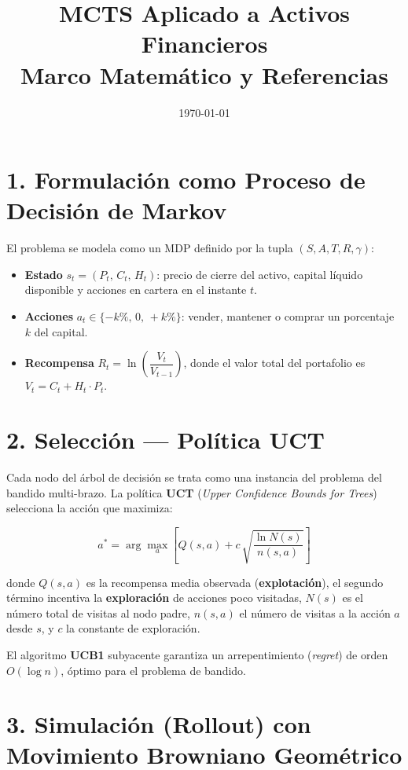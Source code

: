 \documentclass[11pt, a4paper]{article}
\title{\textbf{MCTS Aplicado a Activos Financieros}\\[0.4em]
\large Marco Matemático y Referencias}
\author{}
\date{\today}
\begin{document}
\maketitle
\thispagestyle{empty}

\section*{1. Formulación como Proceso de Decisión de Markov}

El problema se modela como un MDP definido por la tupla $(S, A, T, R, \gamma)$:

\begin{itemize}
  \item \textbf{Estado} $s_t = (P_t,\, C_t,\, H_t)$: precio de cierre del activo, capital líquido disponible y acciones en cartera en el instante $t$.
  \item \textbf{Acciones} $a_t \in \{-k\%,\, 0,\, +k\%\}$: vender, mantener o comprar un porcentaje $k$ del capital.
  \item \textbf{Recompensa} $R_t = \ln\!\left(\dfrac{V_t}{V_{t-1}}\right)$, donde el valor total del portafolio es $V_t = C_t + H_t \cdot P_t$.
\end{itemize}

\section*{2. Selección — Política UCT}

Cada nodo del árbol de decisión se trata como una instancia del problema del bandido multi-brazo. La política \textbf{UCT} (\emph{Upper Confidence Bounds for Trees}) selecciona la acción que maximiza:

\[
  a^* = \arg\max_{a} \left[ Q(s,a) + c\,\sqrt{\frac{\ln N(s)}{n(s,a)}} \right]
\]

donde $Q(s,a)$ es la recompensa media observada (\textbf{explotación}), el segundo término incentiva la \textbf{exploración} de acciones poco visitadas, $N(s)$ es el número total de visitas al nodo padre, $n(s,a)$ el número de visitas a la acción $a$ desde $s$, y $c$ la constante de exploración.

El algoritmo \textbf{UCB1} subyacente garantiza un arrepentimiento (\emph{regret}) de orden $O(\log n)$, óptimo para el problema de bandido.

\section*{3. Simulación (Rollout) con Movimiento Browniano Geométrico}
\end{document}
